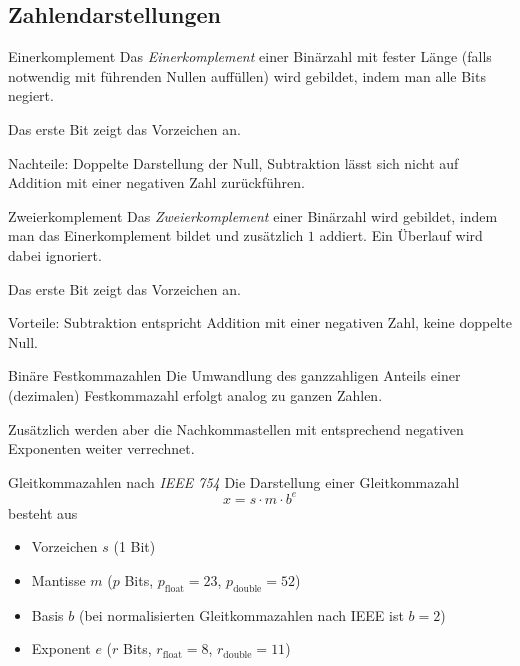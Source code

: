 \newpage
\subsection{Zahlendarstellungen}

\begin{defi}{Einerkomplement}
    Das \emph{Einerkomplement} einer Binärzahl mit fester Länge (falls notwendig mit führenden Nullen auffüllen) wird gebildet, indem man alle Bits negiert.

    Das erste Bit zeigt das Vorzeichen an.

    Nachteile: Doppelte Darstellung der Null, Subtraktion lässt sich nicht auf Addition mit einer negativen Zahl zurückführen.
\end{defi}

\begin{defi}{Zweierkomplement}
    Das \emph{Zweierkomplement} einer Binärzahl wird gebildet, indem man das Einerkomplement bildet und zusätzlich $1$ addiert. Ein Überlauf wird dabei ignoriert.

    Das erste Bit zeigt das Vorzeichen an.

    Vorteile: Subtraktion entspricht Addition mit einer negativen Zahl, keine doppelte Null.
\end{defi}

\begin{defi}{Binäre Festkommazahlen}
    Die Umwandlung des ganzzahligen Anteils einer (dezimalen) Festkommazahl erfolgt analog zu ganzen Zahlen.

    Zusätzlich werden aber die Nachkommastellen mit entsprechend negativen Exponenten weiter \glqq verrechnet\grqq.
\end{defi}

\begin{defi}{Gleitkommazahlen nach \emph{IEEE 754}}
    Die Darstellung einer Gleitkommazahl
    $$
        x = s \cdot m \cdot b^e
    $$
    besteht aus
    \begin{itemize}
        \item Vorzeichen $s$ (1 Bit)
        \item Mantisse $m$ ($p$ Bits, $p_{\text{float}} = 23$, $p_{\text{double}} = 52$)
        \item Basis $b$ (bei normalisierten Gleitkommazahlen nach IEEE ist $b = 2$)
        \item Exponent $e$ ($r$ Bits, $r_{\text{float}} = 8$, $r_{\text{double}} = 11$)
    \end{itemize}
\end{defi}

